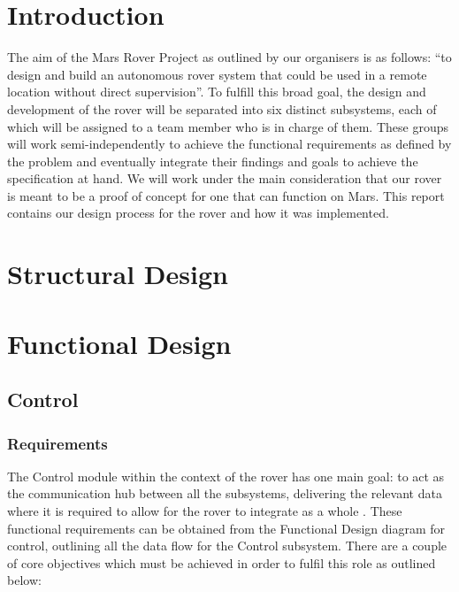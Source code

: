 \documentclass[a4paper]{article}
\begin{document}
\newpage

\section{Introduction}

The aim of the Mars Rover Project as outlined by our organisers is as 
follows: “to design and build an autonomous rover system that could be 
used in a remote location without direct  supervision”.  To fulfill this 
broad goal, the design and development of the rover will be separated into 
six distinct subsystems, each of which will be assigned to a team member 
who is in charge of them. These groups will work semi-independently to 
achieve the functional requirements as defined by the problem and 
eventually integrate their findings and goals to achieve the specification 
at hand. We will work under the main consideration that our rover is meant 
to be a proof of concept for one that can function on Mars. This report 
contains our design process for the rover and how it was implemented.

\section{Structural Design}

\section{Functional Design}

\subsection{Control}

\subsubsection{Requirements}

The Control module within the context of the rover has one main goal: 
to act as the communication hub between all the subsystems, delivering
the relevant data where it is required to allow for the rover to integrate
as a whole \cite{MarsRoverSpec}.  These functional requirements can be 
obtained from the Functional Design diagram for control, outlining all the 
data flow for the Control subsystem. There are a couple of core objectives 
which must be achieved in order to fulfil this role as outlined below:
\end{document}
